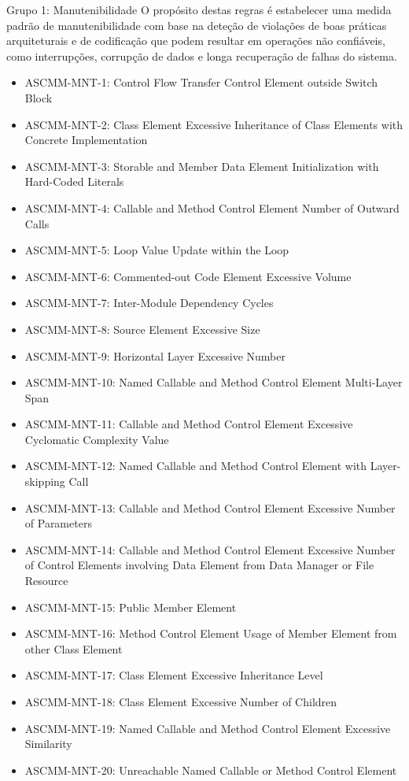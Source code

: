 \documentclass[openany,10pt,a4paper]{article}
\begin{document}
\begin{longtable}
\begin{appendix}
Grupo 1: Manutenibilidade
O propósito destas regras é estabelecer uma medida padrão de manutenibilidade com base na deteção de violações de boas práticas arquiteturais e de codificação que podem resultar em operações não confiáveis, como interrupções, corrupção de dados e longa recuperação de falhas do sistema.
\begin{itemize}
	\setlength\itemsep{0em}
	\item ASCMM-MNT-1: Control Flow Transfer Control Element outside Switch Block
	\item ASCMM-MNT-2: Class Element Excessive Inheritance of Class Elements with Concrete Implementation
	\item ASCMM-MNT-3: Storable and Member Data Element Initialization with Hard-Coded Literals
	\item ASCMM-MNT-4: Callable and Method Control Element Number of Outward Calls
	\item ASCMM-MNT-5: Loop Value Update within the Loop
	\item ASCMM-MNT-6: Commented-out Code Element Excessive Volume
	\item ASCMM-MNT-7: Inter-Module Dependency Cycles
	\item ASCMM-MNT-8: Source Element Excessive Size
	\item ASCMM-MNT-9: Horizontal Layer Excessive Number
	\item ASCMM-MNT-10: Named Callable and Method Control Element Multi-Layer Span
	\item ASCMM-MNT-11: Callable and Method Control Element Excessive Cyclomatic Complexity Value
	\item ASCMM-MNT-12: Named Callable and Method Control Element with Layer-skipping Call
	\item ASCMM-MNT-13: Callable and Method Control Element Excessive Number of Parameters
	\item ASCMM-MNT-14: Callable and Method Control Element Excessive Number of Control Elements involving Data Element from Data Manager or File Resource
	\item ASCMM-MNT-15: Public Member Element	
	\item ASCMM-MNT-16: Method Control Element Usage of Member Element from other Class Element
	\item ASCMM-MNT-17: Class Element Excessive Inheritance Level
	\item ASCMM-MNT-18: Class Element Excessive Number of Children
	\item ASCMM-MNT-19: Named Callable and Method Control Element Excessive Similarity
	\item ASCMM-MNT-20: Unreachable Named Callable or Method Control Element
\end{itemize}


\end{appendix}
\end{longtable}
\end{document}
